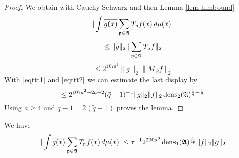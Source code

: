 \begin{proof}
We obtain with Cauchy-Schwarz
and then Lemma \ref{lem hlmbound}
 \begin{equation}
  |\int \overline{g(x)} \sum_{\mathfrak p \in \mathfrak{A}} T_{\mathfrak p} f(x)\, d\mu(x)|
\end{equation}
 \begin{equation}
  \le \|g\|_2 \| \sum_{\mathfrak p \in \mathfrak{A}} T_{\mathfrak p} f \|_2
\end{equation}
 \begin{equation}
  \le 2^{107a^2}\|g\|_2 \|  M_{\mathcal{B}}f \|_2
\end{equation}
With \eqref{eqttt1} and
\eqref{eqttt2} we can estimate the last display by
\begin{equation}
  \le 2^{107a^2+2a+2}(\tilde{q}-1)^{-1} \|g\|_2 \|f\|_2\operatorname{\operatorname{dens}}_2(\mathfrak{A})^{\frac 1{\tilde{q}}-\frac 12}
\end{equation}
Using $a\ge 4$ and
$q-1=2(\tilde{q}-1)$
proves the lemma.
\end{proof}




\begin{lemma}\label{lem decay n}
 We have
    \begin{equation}\label{eqttt3}
  |\int \overline{g(x)} \sum_{\mathfrak p \in \mathfrak{A}} T_{\mathfrak p} f(x)\, d\mu(x)|\le
   \tau^{-1}2^{200a^3}\operatorname{\operatorname{dens}}_1(\mathfrak{A})^{\frac 1{2p}} \|f\|_2\|g\|_2
\end{equation}
\end{lemma}



